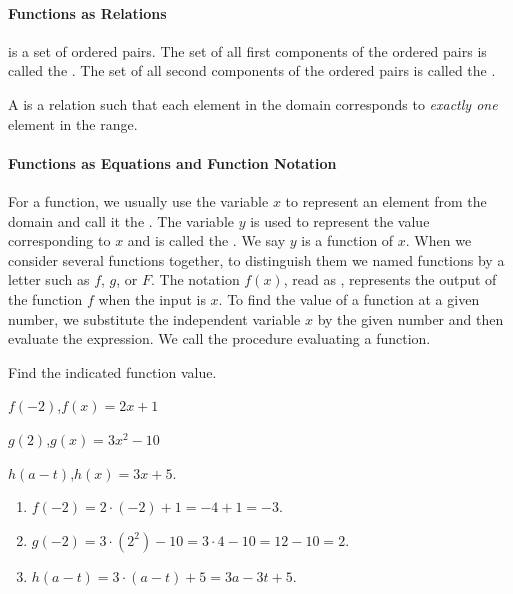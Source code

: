 
\paragraph*{Functions as Relations}
 is a set of ordered pairs. The set of all first components of the ordered pairs is called the . The set of all second components of the ordered pairs is called the .

A  is a relation such that each element in the domain corresponds to \emph{exactly one} element in the range.

\paragraph*{Functions as Equations and Function Notation}

For a function, we usually use the variable $x$ to represent an element from the domain and call it the . The variable $y$ is used to represent the value  corresponding to $x$ and is called the . We say $y$ is a function of $x$. When we consider several functions together, to distinguish them we named functions by a letter such as $f$, $g$, or $F$. The notation $f(x)$, read as , represents the output of the function $f$ when the input is  $x$.
To find the value of a function at a given number, we substitute the independent variable $x$ by the given number and then evaluate the expression. We call the procedure evaluating a function.

\begin{example}
  Find the indicated function value.\\
\begin{enumerate*}[label={(\arabic*)~}]
\item $f(-2)$,\quad $f(x)=2x+1$
\item $g(2)$,\quad $g(x)=3x^2-10$
\item $h(a-t)$,\quad $h(x)=3x+5$.
\end{enumerate*}
\end{example}
\begin{solution}
  \begin{enumerate}[label={\emph{(\arabic*)}~}]
    \item $f(-2)=2\cdot(-2)+1=-4+1=-3$.
    \item $g(-2)=3\cdot(2^2)-10=3\cdot 4-10=12-10=2$.
    \item $h(a-t)=3\cdot(a-t)+5=3a-3t+5$.
    \end{enumerate}
\end{solution}

